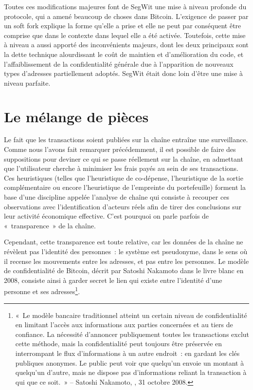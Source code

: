 

Toutes ces modifications majeures font de SegWit une mise à niveau profonde du protocole, qui a amené beaucoup de choses dans Bitcoin. L'exigence de passer par un soft fork explique la forme qu'elle a prise et elle ne peut par conséquent être comprise que dans le contexte dans lequel elle a été activée. Toutefois, cette mise à niveau a aussi apporté des inconvénients majeurs, dont les deux principaux sont la dette technique alourdissant le coût de maintien et d'amélioration du code, et l'affaiblissement de la confidentialité générale due à l'apparition de nouveaux types d'adresses partiellement adoptés. SegWit était donc loin d'être une mise à niveau parfaite.

\section*{Le mélange de pièces}

Le fait que les transactions soient publiées sur la chaîne entraîne une surveillance. Comme nous l'avons fait remarquer précédemment, il est possible de faire des suppositions pour deviner ce qui se passe réellement sur la chaîne, en admettant que l'utilisateur cherche à minimiser les frais payés au sein de ses transactions. Ces heuristiques (telles que l'heuristique de co-dépense, l'heuristique de la sortie complémentaire ou encore l'heuristique de l'empreinte du portefeuille) forment la base d'une discipline appelée l'analyse de chaîne qui consiste à recouper ces observations avec l'identification d'acteurs réels afin de tirer des conclusions sur leur activité économique effective. C'est pourquoi on parle parfois de «~transparence~» de la chaîne. %

Cependant, cette transparence est toute relative, car les données de la chaîne ne révèlent pas l'identité des personnes~: le système est pseudonyme, dans le sens où il recense les mouvements entre les adresses, et pas entre les personnes. Le modèle de confidentialité de Bitcoin, décrit par Satoshi Nakamoto dans le livre blanc en 2008, consiste ainsi à garder secret le lien qui existe entre l'identité d'une personne et ses adresses\footnote{«~Le modèle bancaire traditionnel atteint un certain niveau de confidentialité en limitant l'accès aux informations aux parties concernées et au tiers de confiance. La nécessité d'annoncer publiquement toutes les transactions exclut cette méthode, mais la confidentialité peut toujours être préservée en interrompant le flux d'informations à un autre endroit~: en gardant les clés publiques anonymes. Le public peut voir que quelqu'un envoie un montant à quelqu'un d'autre, mais ne dispose pas d'informations reliant la transaction à qui que ce soit.~» -- Satoshi Nakamoto, , 31 octobre 2008.}.

